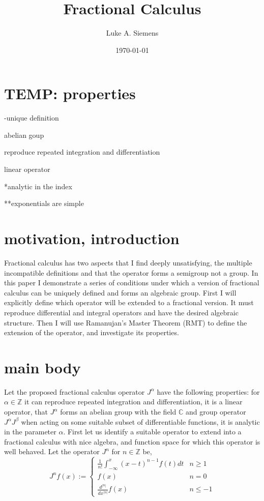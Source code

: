 \documentclass[%
 onecolumn,
 amsmath, amssymb, aps, pra, 10pt
]{revtex4-2}
\begin{document}
\title{Fractional Calculus}%
\author{Luke A. Siemens}
\noaffiliation
\date{\today}
\maketitle

\section{TEMP: properties}
-unique definition

abelian goup

reproduce repeated integration and differentiation

linear operator

*analytic in the index

**exponentials are simple


\section{motivation, introduction}
Fractional calculus has two aspects that I find deeply unsatisfying, the multiple incompatible definitions and that the operator forms a semigroup not a group. In this paper I demonstrate a series of conditions under which a version of fractional calculus can be uniquely defined and forms an algebraic group. First I will explicitly define which operator will be extended to a fractional version. It must reproduce differential and integral operators and have the desired algebraic structure. Then I will use Ramanujan's Master Theorem (RMT) to define the extension of the operator, and investigate its properties.  

\section{main body}
Let the proposed fractional calculus operator $J^\alpha$ have the following properties: for $\alpha \in \mathbb{Z}$ it can reproduce repeated integration and differentiation, it is a linear operator, that $J^\alpha$ forms an abelian group with the field $\mathbb{C}$ and group operator $J^\alpha J^\beta$ when acting on some suitable subset of differentiable functions, it is analytic in the parameter $\alpha$. First let us identify a suitable operator to extend into a fractional calculus with nice algebra, and function space for which this operator is well behaved. Let the operator $J^n$ for $n \in \mathbb{Z}$ be,
\begin{equation}
J^n f(x) := \begin{cases} \frac{1}{n!}\int_{-\infty}^x (x - t)^{n - 1}f(t)dt & n \geq 1 \\ f(x) & n = 0 \\ \frac{d^{\left|n\right|}}{dx^{\left|n\right|}}f(x) & n \leq -1 \end{cases}
\label{integer_calculus}
\end{equation}
\end{document}
